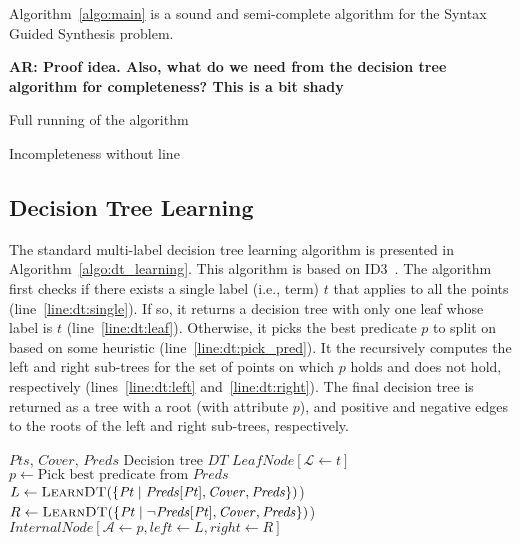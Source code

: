 \documentclass{llncs}
\newcommand\arsays[1]{{\bf AR: #1}}
\newcommand\Points{\mathit{Pts}}
\newcommand\Point{\mathit{Pt}}
\newcommand\Predicates{\mathit{Preds}}
\newcommand\Pred{p}
\newcommand\Terms{\mathit{Terms}}
\newcommand\Term{t}
\newcommand\Cover{\mathit{Cover}}
\newcommand\DecisionTree{\mathit{DT}}
\newcommand\Attribute{\mathcal{A}}
\newcommand\Label{\mathcal{L}}
\begin{document}
\begin{theorem}
  Algorithm~\ref{algo:main} is a sound and semi-complete algorithm for the
  Syntax Guided Synthesis problem.
\end{theorem}
\arsays{Proof idea. Also, what do we need from the decision tree
algorithm for completeness? This is a bit shady}

\begin{example}
  Full running of the algorithm
\end{example}

\begin{example}
  Incompleteness without line~\label{line:main:more_preds}
\end{example}

\subsection{Decision Tree Learning}
\label{sec:decision_trees}

The standard multi-label decision tree learning algorithm is presented
in Algorithm~\ref{algo:dt_learning}.
This algorithm is based on ID3~\cite{ID3}.
The algorithm first checks if there exists a single label (i.e., term)
$\Term$ that applies to all the points (line~\ref{line:dt:single}).
If so, it returns a decision tree with only one leaf whose label is
$\Term$ (line~\ref{line:dt:leaf}).
Otherwise, it picks the best predicate $\Pred$ to split on based on some
heuristic (line~\ref{line:dt:pick_pred}).
It the recursively computes the left and right sub-trees for the set of
points on which $\Pred$ holds and does not hold, respectively
(lines~\ref{line:dt:left} and~\ref{line:dt:right}).
The final decision tree is returned as a tree with a root (with
attribute $\Pred$), and positive and negative edges to the roots of the
left and right sub-trees, respectively.

\begin{algorithm}
  \begin{algorithmic}
    \Require $\Points$, $\Cover$, $\Predicates$
    \Ensure Decision tree $\DecisionTree$
    \If { $\exists \Term : \Cover[\Terms] \supseteq \Points$ }\label{line:dt:single}
    \Return $\mathit{LeafNode}[\Label \gets \Term]$ \label{line:dt:leaf}
    \EndIf
    \State $\Pred \gets \mbox{Pick best predicate from $\Predicates$}$\label{line:dt:pick_pred}
    \State $L \gets \Call{LearnDT}{\{ \Point \mid \Predicates[\Point], \Cover, \Predicates \}}$\label{line:dt:left})
    \State $R \gets \Call{LearnDT}{\{ \Point \mid \neg \Predicates[\Point], \Cover, \Predicates \}}$\label{line:dt:right})
    \State \Return $\mathit{InternalNode}[\Attribute \gets \Pred,  left \gets L , right \gets R ]$
  \end{algorithmic}
\end{algorithm}
\end{document}
